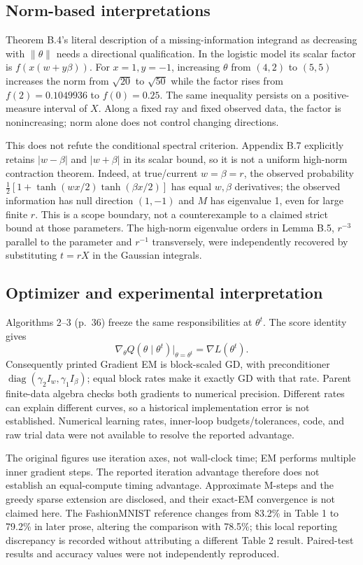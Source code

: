 \documentclass[10pt]{article}
\begin{document}
\subsection*{Norm-based interpretations}
Theorem B.4’s literal description of a missing-information integrand as decreasing with \(\|\theta\|\) needs a directional qualification. In the logistic model its scalar factor is \(f(x(w+y\beta))\). For \(x=1,y=-1\), increasing \(\theta\) from \((4,2)\) to \((5,5)\) increases the norm from \(\sqrt{20}\) to \(\sqrt{50}\) while the factor rises from \(f(2)=0.1049936\) to \(f(0)=0.25\). The same inequality persists on a positive-measure interval of \(X\). Along a fixed ray and fixed observed data, the factor is nonincreasing; norm alone does not control changing directions.\par
This does not refute the conditional spectral criterion. Appendix B.7 explicitly retains \(|w-\beta|\) and \(|w+\beta|\) in its scalar bound, so it is not a uniform high-norm contraction theorem. Indeed, at true/current \(w=\beta=r\), the observed probability \(\tfrac12[1+\tanh(wx/2)\tanh(\beta x/2)]\) has equal \(w,\beta\) derivatives; the observed information has null direction \((1,-1)\) and \(M\) has eigenvalue 1, even for large finite \(r\). This is a scope boundary, not a counterexample to a claimed strict bound at those parameters. The high-norm eigenvalue orders in Lemma B.5, \(r^{-3}\) parallel to the parameter and \(r^{-1}\) transversely, were independently recovered by substituting \(t=rX\) in the Gaussian integrals.\par
\subsection*{Optimizer and experimental interpretation}
Algorithms 2–3 (p. 36) freeze the same responsibilities at \(\theta^t\). The score identity gives \[\nabla_\theta Q(\theta\mid\theta^t)|_{\theta=\theta^t}=\nabla L(\theta^t).\] Consequently printed Gradient EM is block-scaled GD, with preconditioner \(\operatorname{diag}(\gamma_2 I_w,\gamma_1 I_\beta)\); equal block rates make it exactly GD with that rate. Parent finite-data algebra checks both gradients to numerical precision. Different rates can explain different curves, so a historical implementation error is not established. Numerical learning rates, inner-loop budgets/tolerances, code, and raw trial data were not available to resolve the reported advantage.\par
The original figures use iteration axes, not wall-clock time; EM performs multiple inner gradient steps. The reported iteration advantage therefore does not establish an equal-compute timing advantage. Approximate M-steps and the greedy sparse extension are disclosed, and their exact-EM convergence is not claimed here. The FashionMNIST reference changes from 83.2\% in Table 1 to 79.2\% in later prose, altering the comparison with 78.5\%; this local reporting discrepancy is recorded without attributing a different Table 2 result. Paired-test results and accuracy values were not independently reproduced.\par
\end{document}
